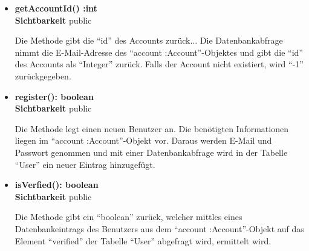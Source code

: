 \begin{itemize}
\item \textbf{getAccountId() :int}\hfill\\
\textbf{Sichtbarkeit} public

Die Methode gibt die ``id'' des Accounts zurück... Die Datenbankabfrage nimmt die E-Mail-Adresse des ``account :Account''-Objektes und gibt die ``id'' des Accounts als ``Integer'' zurück. Falls der Account nicht existiert, wird ``-1'' zurückgegeben.

\item \textbf{register(): boolean}\hfill\\
\textbf{Sichtbarkeit} public

Die Methode legt einen neuen Benutzer an. Die benötigten Informationen liegen im ``account :Account''-Objekt vor. Daraus werden E-Mail und Passwort genommen und mit einer Datenbankabfrage wird in der Tabelle ``User'' ein neuer Eintrag hinzugefügt. 

\item \textbf{isVerfied(): boolean}\hfill\\
\textbf{Sichtbarkeit} public

Die Methode gibt ein ``boolean'' zurück, welcher mittles eines Datenbankeintrags des Benutzers aus dem ``account :Account''-Objekt auf das Element ``verified'' der Tabelle ``User'' abgefragt wird, ermittelt wird.

\end{itemize}